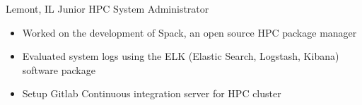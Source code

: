 
        {Lemont, IL}
        {Junior HPC System Administrator}
        {}{
    \begin{itemize}
        \item Worked on the development of Spack, an open source HPC package manager
        \item Evaluated system logs using the ELK (Elastic Search, Logstash, Kibana) software package
        \item Setup Gitlab Continuous integration server for HPC cluster
    \end{itemize}
}
